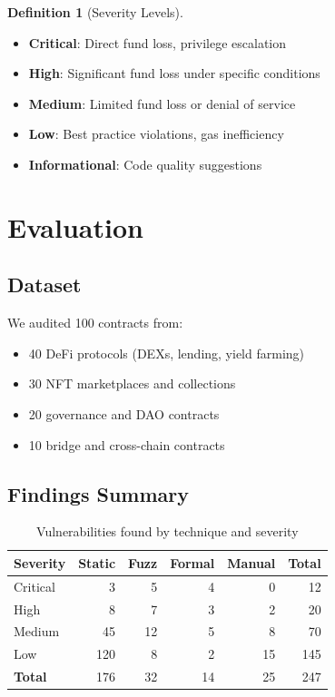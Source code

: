 \documentclass[11pt,a4paper]{article}
\theoremstyle{definition}
\newtheorem{definition}{Definition}
\begin{document}
\begin{definition}[Severity Levels]
\begin{itemize}
    \item \textbf{Critical}: Direct fund loss, privilege escalation
    \item \textbf{High}: Significant fund loss under specific conditions
    \item \textbf{Medium}: Limited fund loss or denial of service
    \item \textbf{Low}: Best practice violations, gas inefficiency
    \item \textbf{Informational}: Code quality suggestions
\end{itemize}
\end{definition}

\section{Evaluation}

\subsection{Dataset}

We audited 100 contracts from:
\begin{itemize}
    \item 40 DeFi protocols (DEXs, lending, yield farming)
    \item 30 NFT marketplaces and collections
    \item 20 governance and DAO contracts
    \item 10 bridge and cross-chain contracts
\end{itemize}

\subsection{Findings Summary}

\begin{table}[h]
\centering
\begin{tabular}{lrrrrr}
\toprule
\textbf{Severity} & \textbf{Static} & \textbf{Fuzz} & \textbf{Formal} & \textbf{Manual} & \textbf{Total} \\
\midrule
Critical & 3 & 5 & 4 & 0 & 12 \\
High & 8 & 7 & 3 & 2 & 20 \\
Medium & 45 & 12 & 5 & 8 & 70 \\
Low & 120 & 8 & 2 & 15 & 145 \\
\midrule
\textbf{Total} & 176 & 32 & 14 & 25 & 247 \\
\bottomrule
\end{tabular}
\caption{Vulnerabilities found by technique and severity}
\end{table}
\end{document}
